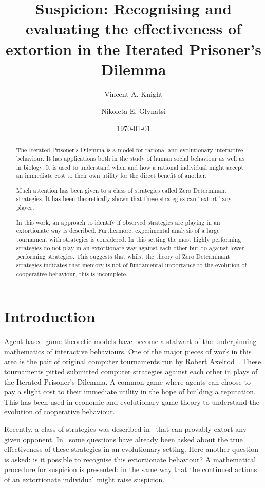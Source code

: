 \documentclass[a4paper]{article}
\title{Suspicion: Recognising and evaluating the effectiveness
       of extortion in the Iterated Prisoner's Dilemma}
\author{Vincent A. Knight \and Nikoleta E. Glynatsi}
\date{\today}
\begin{document}
\maketitle

\begin{abstract}
    The Iterated Prisoner's Dilemma is a model for rational and evolutionary
    interactive behaviour. It has applications both in the study of human social
    behaviour as well as in biology.
    It is used to understand when and how a rational individual might
    accept an immediate cost to their own utility for the direct benefit of
    another.

    Much attention has been given to a class of strategies called
    Zero Determinant strategies. It has been theoretically shown that these
    strategies can ``extort'' any player.

    In this work, an approach to identify if observed strategies are playing in
    an extortionate way is described. Furthermore, experimental analysis of
    a large tournament with 
    strategies is considered. In this setting
    the most highly performing strategies do not play in an extortionate way
    against each other but do against lower performing strategies.
    This suggests that whilst the theory of Zero Determinant strategies
    indicates that memory is not of fundamental importance to the evolution of
    cooperative behaviour, this is incomplete.
\end{abstract}

\section{Introduction}\label{sec:introduction}

Agent based game theoretic models have become a stalwart of the underpinning
mathematics of interactive behaviours. One of the major pieces of work
in this area is the pair of original computer tournaments run by Robert
Axelrod~\cite{Axelrod1980, Axelrod1980a}. These tournaments pitted submitted
computer strategies against each other in plays of the Iterated Prisoner's
Dilemma. A common game where agents can choose to pay a slight cost to their
immediate utility in the hope of building a reputation. This has been used in
economic and evolutionary game theory to understand the evolution of cooperative
behaviour.

Recently, a class of strategies was described in~\cite{Press2012} that can
provably extort any given opponent. In~\cite{Hilbe2013, Moran1707} some
questions have already been asked about the true effectiveness of these
strategies in an evolutionary setting. Here another question is asked: is it
possible to recognise this extortionate behaviour? A mathematical procedure for
suspicion is presented: in the same way that the continued actions of an
extortionate individual might raise suspicion.
\end{document}
